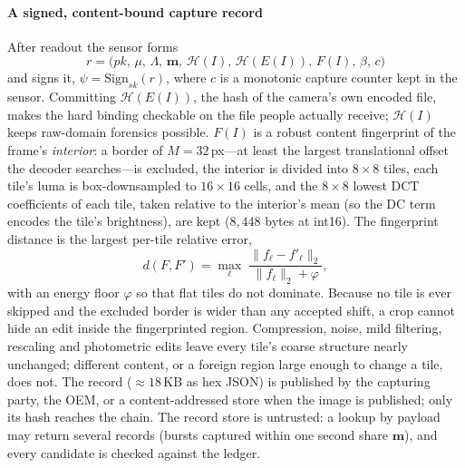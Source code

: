 \documentclass[journal]{IEEEtran}
\begin{document}
\paragraph{A signed, content-bound capture record}
After readout the sensor forms
\begin{equation}
r = \big(\mathit{pk},\,\mu,\,\Lambda,\,\mathbf{m},\,\mathcal H(I),\,\mathcal H(E(I)),\,F(I),\,\beta,\,c\big)
\label{eq:record}
\end{equation}
and signs it, $\psi=\mathrm{Sign}_{\mathit{sk}}(r)$, where $c$ is a monotonic
capture counter kept in the sensor. Committing $\mathcal H(E(I))$, the hash of
the camera's own encoded file, makes the hard binding checkable on the file
people actually receive; $\mathcal H(I)$ keeps raw-domain forensics possible.
$F(I)$ is a robust content fingerprint of the frame's \emph{interior}: a border
of $M\!=\!32$\,px---at least the largest translational offset the decoder
searches---is excluded, the interior is divided into $8\times8$ tiles, each
tile's luma is box-downsampled to $16\times16$ cells, and the $8\times8$ lowest
DCT coefficients of each tile, taken relative to the interior's mean (so the
DC term encodes the tile's brightness), are kept ($8{,}448$ bytes at int16).
The fingerprint distance is the largest per-tile relative error,
\begin{equation}
d(F,F') = \max_{\ell}\;\frac{\lVert f_\ell - f'_\ell\rVert_2}{\lVert f_\ell\rVert_2+\varphi},
\label{eq:fpdist}
\end{equation}
with an energy floor $\varphi$ so that flat tiles do not dominate. Because no
tile is ever skipped and the excluded border is wider than any accepted shift, a
crop cannot hide an edit inside the fingerprinted region. Compression, noise,
mild filtering, rescaling and photometric edits leave every tile's coarse
structure nearly unchanged; different content, or a foreign region large enough
to change a tile, does not. The record ($\approx\!18$\,KB as hex JSON) is published by the
capturing party, the OEM, or a content-addressed store when the image is
published; only its hash reaches the chain. The record store is untrusted: a
lookup by payload may return several records (bursts captured within one second
share $\mathbf{m}$), and every candidate is checked against the ledger.
\end{document}
